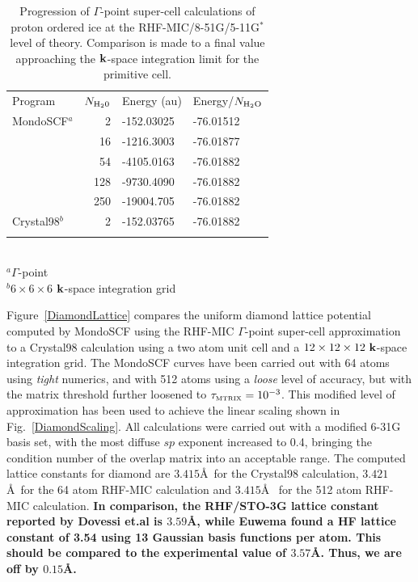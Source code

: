 \documentclass[prb,aps,nobibnotes,twocolumn,doublespace,twocolumngrid,superbib]{revtex4}
\begin{document}
\begin{table}[h]
\caption{Progression of $\Gamma$-point super-cell calculations of proton ordered ice
at the RHF-MIC/8-51G/5-11G$^*$ level of theory.   Comparison is made to a final value 
approaching the $\bf k$-space integration limit for the primitive cell.}
\label{PIceTable}
\begin{tabular}{lrll}
\toprule
Program         & $N_{\rm H_20}$              & Energy (au)    & Energy/$N_{\rm H_2O}$\\ 
\colrule
{\sc MondoSCF}$^a$  & 2    &  -152.03025  &  -76.01512  \\
                    & 16   &  -1216.3003  &  -76.01877  \\
                    & 54   &  -4105.0163  &  -76.01882  \\
                    & 128  &  -9730.4090  &  -76.01882  \\
                    & 250  &  -19004.705  &  -76.01882  \\ 
\hline
{\sc Crystal98}$^b$  & 2   &  -152.03765  &  -76.01882  \\ 
\botrule
\end{tabular}\\
$^a \Gamma$-point\\
$^b 6\times6\times6$ $\bf k$-space integration grid \\
\end{table}


Figure~\ref{DiamondLattice} compares the uniform diamond lattice potential computed 
by MondoSCF using the RHF-MIC $\Gamma$-point super-cell approximation to a {\sc Crystal98}
calculation using a two atom unit cell and a $12 \times 12 \times 12 ~{\bf k}$-space integration grid.
The {\sc MondoSCF} curves have been carried out with 64 atoms using {\it tight}
numerics, and with 512 atoms using a {\it loose} level of accuracy, but with the matrix
threshold further loosened to $\Huge \tau_{\rm \scriptscriptstyle MTRIX}=10^{-3}$. 
This modified level of approximation has been used to achieve the linear scaling shown 
in Fig.~\ref{DiamondScaling}. All calculations were carried out with a modified 6-31G basis set, 
with the most diffuse $sp$ exponent increased to 0.4, bringing the condition number 
of the overlap matrix into an acceptable range.  The computed lattice constants 
for diamond are $3.415$\AA~for the {\sc Crystal98} calculation, $3.421$\AA~for 
the 64 atom RHF-MIC calculation and $3.415$\AA~ for the 512 atom RHF-MIC calculation.
{\bf In comparison, the RHF/STO-3G lattice constant reported by Dovessi et.al \cite{RDovesei80b} 
is $3.59$\AA, while Euwema \cite{REuwema73} found a HF lattice constant of 3.54 using 13 
Gaussian basis functions per atom.  This should be compared to the experimental value of $3.57$\AA.
Thus, we are off by $0.15$\AA. }
\end{document}
